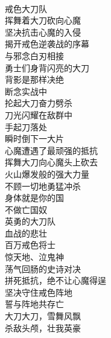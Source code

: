 \begin{poem}[戒色喜峰口]
    \begin{multicols}{2}
        \begin{center}~\\
            戒色大刀队 \\ 挥舞着大刀砍向心魔 \\ 坚决抗击心魔的入侵 \\ 揭开戒色逆袭战的序幕 \\ 与邪念白刃相接 \\ 勇士们身背闪亮的大刀 \\ 背影是那样决绝 \\ 断念实战中 \\ 抡起大刀奋力劈杀 \\ 刀光闪耀在敌群中 \\ 手起刀落处 \\ 瞬时倒下一大片 \\ 心魔遭遇了最顽强的抵抗 \\ 挥舞大刀向心魔头上砍去 \\ 火山爆发般的强大力量 \\ 不顾一切地勇猛冲杀 \\ 身体就是你的国 \\ 不做亡国奴 \\ 英勇的大刀队 \\ 血战的悲壮 \\ 百万戒色将士 \\ 惊天地、泣鬼神 \\ 荡气回肠的史诗对决 \\ 拼死抵抗，绝不让心魔得逞 \\ 坚决守住戒色阵地 \\ 誓与阵地共存亡 \\ 大刀大刀，雪舞风飘 \\ 杀敌头颅，壮我英豪
        \end{center}
    \end{multicols}
\end{poem}

